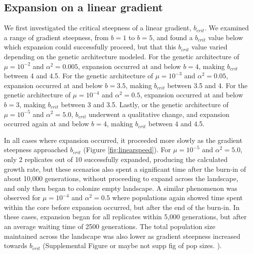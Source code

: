 \subsection{Expansion on a linear gradient}

We first investigated the critical steepness of a linear gradient, $b_{crit}$. %
We examined a range of gradient steepness, from $b = 1$ to $b = 5$, and found a $b_{crit}$ value below which expansion could successfully proceed, but that this $b_{crit}$ value varied depending on the genetic architecture modeled. For the genetic architecture of  $\mu = 10^{-2}$ and $\alpha^2 = 0.005$, expansion occurred at and below $b = 4$, making $b_{crit}$ between 4 and 4.5. For the genetic architecture of  $\mu = 10^{-3}$ and $\alpha^2 = 0.05$, expansion occurred at and below $b = 3.5$, making $b_{crit}$ between 3.5 and 4. For the genetic architecture of  $\mu = 10^{-4}$ and $\alpha^2 = 0.5$, expansion occurred at and below $b = 3$, making $b_{crit}$ between 3 and 3.5. Lastly, or the genetic architecture of  $\mu = 10^{-5}$ and $\alpha^2 = 5.0$, $b_{crit}$ underwent a qualitative change, and expansion occurred again at and below $b = 4$, making $b_{crit}$ between 4 and 4.5.

In all cases where expansion occurred, it proceeded more slowly as the gradient steepness approached $b_{crit}$ (Figure \ref{fig:linearspeed}). For $\mu = 10^{-5}$ and $\alpha^2 = 5.0$, only 2 replicates out of 10 successfully expanded, producing the calculated growth rate, but these scenarios also spent a significant time after the burn-in of about 10,000 generations, without proceeding to expand across the landscape, and only then began to colonize empty landscape. A similar phenomenon was observed for $\mu = 10^{-4}$ and $\alpha^2 = 0.5$ where populations again showed time spent within the core before expansion occurred, but after the end of the burn-in. In these cases, expansion began for all replicates within 5,000 generations, but after an average waiting time of \color{red}2500 \color{black} generations. The total population size maintained across the landscape was also lower as gradient steepness increased towards $b_{crit}$ (\color{red}Supplemental Figure or maybe not supp fig of pop sizes.\color{black} ). 

